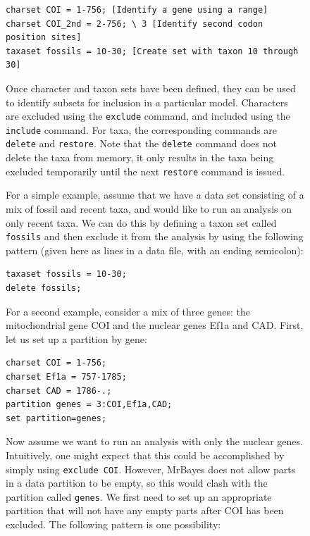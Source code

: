 \documentclass[12pt]{book}
\newcommand{\ttt}[1]{\texttt{#1}}
\begin{document}
\begin{figure}[h]
\footnotesize
\begin{singlespacing}
\begin{verbatim}
charset COI = 1-756; [Identify a gene using a range]
charset COI_2nd = 2-756; \ 3 [Identify second codon position sites]
taxaset fossils = 10-30; [Create set with taxon 10 through 30]
\end{verbatim}
\end{singlespacing}
\normalsize

Once character and taxon sets have been defined, they can be used to identify subsets for inclusion
in a particular model. Characters are excluded using the \ttt{exclude} command, and included using
the \ttt{include} command. For taxa, the corresponding commands are \ttt{delete} and \ttt{restore}.
Note that the \ttt{delete} command does not delete the taxa from memory, it only results in the
taxa being excluded temporarily until the next \ttt{restore} command is issued.

For a simple example, assume that we have a data set consisting of a mix of fossil and recent taxa,
and would like to run an analysis on only recent taxa. We can do this by defining a taxon set
called \ttt{fossils} and then exclude it from the analysis by using the following pattern (given
here as lines in a data file, with an ending semicolon):

\footnotesize
\begin{singlespacing}
\begin{verbatim}
taxaset fossils = 10-30;
delete fossils;
\end{verbatim}
\end{singlespacing}
\normalsize

For a second example, consider a mix of three genes: the mitochondrial gene COI and the nuclear
genes Ef1a and CAD. First, let us set up a partition by gene:

\footnotesize
\begin{singlespacing}
\begin{verbatim}
charset COI = 1-756;
charset Ef1a = 757-1785;
charset CAD = 1786-.;
partition genes = 3:COI,Ef1a,CAD;
set partition=genes;
\end{verbatim}
\end{singlespacing}
\normalsize

Now assume we want to run an analysis with only the nuclear genes. Intuitively, one might expect
that this could be accomplished by simply using \ttt{exclude COI}. However, MrBayes does not allow
parts in a data partition to be empty, so this would clash with the partition called \ttt{genes}.
We first need to set up an appropriate partition that will not have any empty parts after COI has
been excluded. The following pattern is one possibility:


\end{figure}
\end{document}
